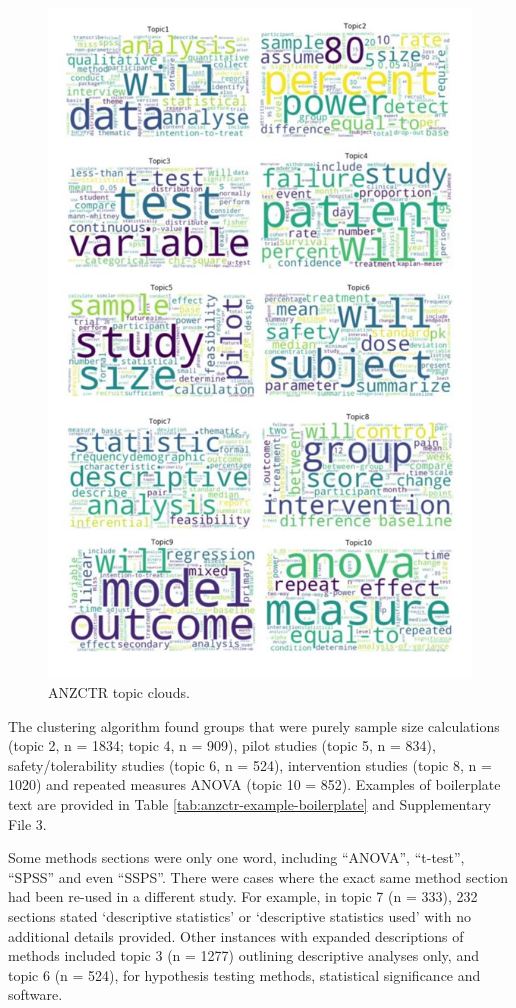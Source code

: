 \documentclass[12pt]{article}
\begin{document}
\begin{figure}

{\centering \includegraphics[width=0.7\linewidth]{figures/anzctrwordclouds} 

}

\caption{ANZCTR topic clouds.}\label{fig:unnamed-chunk-9}
\end{figure}

The clustering algorithm found groups that were purely sample size
calculations (topic 2, n = 1834; topic 4, n = 909), pilot studies (topic
5, n = 834), safety/tolerability studies (topic 6, n = 524),
intervention studies (topic 8, n = 1020) and repeated measures ANOVA
(topic 10 = 852). Examples of boilerplate text are provided in Table
\ref{tab:anzctr-example-boilerplate} and Supplementary File 3.

Some methods sections were only one word, including ``ANOVA'',
``t-test'', ``SPSS'' and even ``SSPS''. There were cases where the exact
same method section had been re-used in a different study. For example,
in topic 7 (n = 333), 232 sections stated `descriptive statistics' or
`descriptive statistics used' with no additional details provided. Other
instances with expanded descriptions of methods included topic 3 (n =
1277) outlining descriptive analyses only, and topic 6 (n = 524), for
hypothesis testing methods, statistical significance and software.
\end{document}
